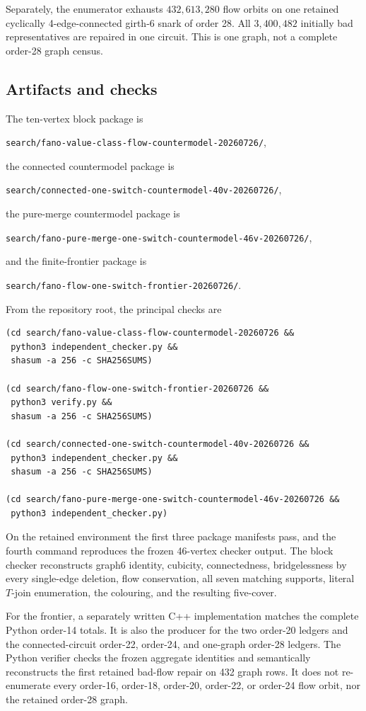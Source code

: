 \documentclass[11pt]{article}
\theoremstyle{definition}
\theoremstyle{remark}
\begin{document}
Separately, the enumerator exhausts \(432{,}613{,}280\) flow orbits on
one retained cyclically 4-edge-connected girth-6 snark of order 28.  All
\(3{,}400{,}482\) initially bad representatives are repaired in one
circuit.  This is one graph, not a complete order-28 graph census.

\subsection*{Artifacts and checks}

The ten-vertex block package is
\begin{center}
\texttt{search/fano-value-class-flow-countermodel-20260726/},
\end{center}
the connected countermodel package is
\begin{center}
\texttt{search/connected-one-switch-countermodel-40v-20260726/},
\end{center}
the pure-merge countermodel package is
\begin{center}
\texttt{search/fano-pure-merge-one-switch-countermodel-46v-20260726/},
\end{center}
and the finite-frontier package is
\begin{center}
\texttt{search/fano-flow-one-switch-frontier-20260726/}.
\end{center}
From the repository root, the principal checks are
\begin{verbatim}
(cd search/fano-value-class-flow-countermodel-20260726 &&
 python3 independent_checker.py &&
 shasum -a 256 -c SHA256SUMS)

(cd search/fano-flow-one-switch-frontier-20260726 &&
 python3 verify.py &&
 shasum -a 256 -c SHA256SUMS)

(cd search/connected-one-switch-countermodel-40v-20260726 &&
 python3 independent_checker.py &&
 shasum -a 256 -c SHA256SUMS)

(cd search/fano-pure-merge-one-switch-countermodel-46v-20260726 &&
 python3 independent_checker.py)
\end{verbatim}
On the retained environment the first three package manifests pass, and
the fourth command reproduces the frozen 46-vertex checker output.  The block
checker reconstructs graph6 identity, cubicity, connectedness,
bridgelessness by every single-edge deletion, flow conservation, all seven
matching supports, literal \(T\)-join enumeration, the colouring, and the
resulting five-cover.

For the frontier, a separately written C++ implementation matches the
complete Python order-14 totals.  It is also the producer for the two
order-20 ledgers and the connected-circuit order-22, order-24, and
one-graph order-28 ledgers.  The Python
verifier checks the frozen aggregate identities and semantically
reconstructs the first retained bad-flow repair on 432 graph rows.  It
does not re-enumerate every order-16, order-18, order-20, order-22, or
order-24 flow orbit, nor the retained order-28 graph.
\end{document}
